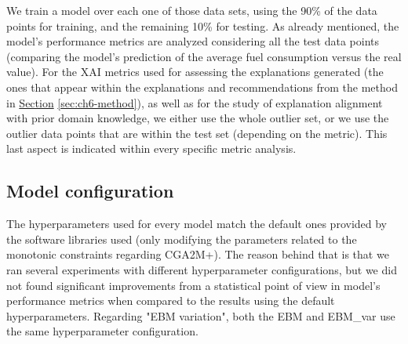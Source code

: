 \begin{table}[h!]
\centering
{}
\caption{Data set description, including the number of data points, number and type of vehicles.}
\label{table:ch6-data-description}
\end{table}

We train a model over each one of those data sets, using the 90\% of the data points for training, and the remaining 10\% for testing. As already mentioned, the model's performance metrics are analyzed considering all the test data points (comparing the model's prediction of the average fuel consumption versus the real value). For the XAI metrics used for assessing the explanations generated (the ones that appear within the explanations and recommendations from the method in \hyperref[sec:ch6-method]{Section} \ref{sec:ch6-method}), as well as for the study of explanation alignment with prior domain knowledge, we either use the whole outlier set, or we use the outlier data points that are within the test set (depending on the metric). This last aspect is indicated within every specific metric analysis.

\subsection{Model configuration}\label{subsec:ch6-model-params}
The hyperparameters used for every model match the default ones provided by the software libraries used (only modifying the parameters related to the monotonic constraints regarding CGA2M+). The reason behind that is that we ran several experiments with different hyperparameter configurations, but we did not found significant improvements from a statistical point of view in model's performance metrics when compared to the results using the default hyperparameters.  Regarding "EBM variation", both the EBM and EBM\_var use the same hyperparameter configuration.

